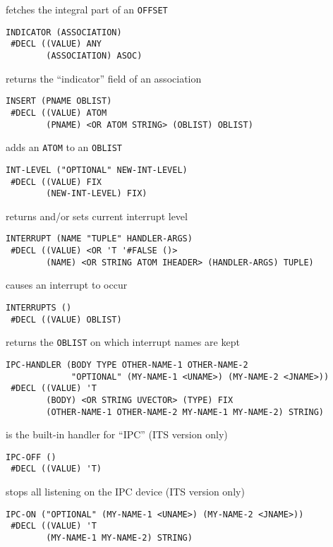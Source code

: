 \documentclass[a4paper,]{article}
\begin{document}
fetches the integral part of an \texttt{OFFSET}

\begin{verbatim}
INDICATOR (ASSOCIATION)
 #DECL ((VALUE) ANY
        (ASSOCIATION) ASOC)
\end{verbatim}

returns the ``indicator'' field of an association

\begin{verbatim}
INSERT (PNAME OBLIST)
 #DECL ((VALUE) ATOM
        (PNAME) <OR ATOM STRING> (OBLIST) OBLIST)
\end{verbatim}

adds an \texttt{ATOM} to an \texttt{OBLIST}

\begin{verbatim}
INT-LEVEL ("OPTIONAL" NEW-INT-LEVEL)
 #DECL ((VALUE) FIX
        (NEW-INT-LEVEL) FIX)
\end{verbatim}

returns and/or sets current interrupt level

\begin{verbatim}
INTERRUPT (NAME "TUPLE" HANDLER-ARGS)
 #DECL ((VALUE) <OR 'T '#FALSE ()>
        (NAME) <OR STRING ATOM IHEADER> (HANDLER-ARGS) TUPLE)
\end{verbatim}

causes an interrupt to occur

\begin{verbatim}
INTERRUPTS ()
 #DECL ((VALUE) OBLIST)
\end{verbatim}

returns the \texttt{OBLIST} on which interrupt names are kept

\begin{verbatim}
IPC-HANDLER (BODY TYPE OTHER-NAME-1 OTHER-NAME-2
             "OPTIONAL" (MY-NAME-1 <UNAME>) (MY-NAME-2 <JNAME>))
 #DECL ((VALUE) 'T
        (BODY) <OR STRING UVECTOR> (TYPE) FIX
        (OTHER-NAME-1 OTHER-NAME-2 MY-NAME-1 MY-NAME-2) STRING)
\end{verbatim}

is the built-in handler for ``IPC'' (ITS version only)

\begin{verbatim}
IPC-OFF ()
 #DECL ((VALUE) 'T)
\end{verbatim}

stops all listening on the IPC device (ITS version only)

\begin{verbatim}
IPC-ON ("OPTIONAL" (MY-NAME-1 <UNAME>) (MY-NAME-2 <JNAME>))
 #DECL ((VALUE) 'T
        (MY-NAME-1 MY-NAME-2) STRING)
\end{verbatim}
\end{document}
